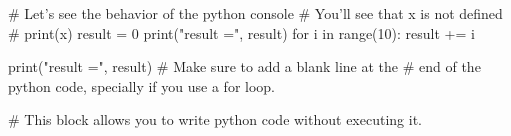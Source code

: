 \documentclass[11pt]{article}%
\begin{document}
\vspace{5em}

\begin{pyconsole}
# Let's see the behavior of the python console
# You'll see that x is not defined
# print(x)
result = 0
print("result =", result)
for i in range(10):
    result += i

print("result =", result)
# Make sure to add a blank line at the 
# end of the python code, specially if you use a for loop.
\end{pyconsole}

\begin{pyverbatim}
# This block allows you to write python code without executing it.
\end{pyverbatim}
\end{document}
